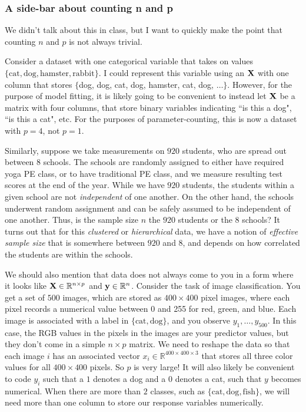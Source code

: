 \subsubsection{A side-bar about counting n and p}

We didn't talk about this in class, but I want to quickly make the point that counting $n$ and $p$ is not always trivial. 

Consider a dataset with one categorical variable that takes on values $\{ \text{cat}, \text{dog}, \text{hamster}, \text{rabbit} \}$. I could represent this variable using an $\bold{X}$  with one column that stores $\{$dog, dog, cat, dog, hamster, cat, dog, $\ldots \}$. However, for the purpose of model fitting, it is likely going to be convenient to instead let $\bold{X}$ be a matrix with four columns, that store binary variables indicating ``is this a dog", ``is this a cat", etc. For the purposes of parameter-counting, this is now a dataset with $p=4$, not $p=1$. 

Similarly, suppose we take measurements on $920$ students, who are spread out between $8$ schools. The schools are randomly assigned to either have required yoga PE class, or to have traditional PE class, and we measure resulting test scores at the end of the year. While we have $920$ students, the students within a given school are not \emph{independent} of one another. On the other hand, the schools underwent random assignment and can be safely assumed to be independent of one another. Thus, is the sample size $n$ the $920$ students or the $8$ schools? It turns out that for this \emph{clustered} or \emph{hierarchical} data, we have a notion of \emph{effective sample size} that is somewhere between $920$ and $8$, and depends on how correlated the students are within the schools. 

We should also mention that data does not always come to you in a form where it looks like $\bold{X} \in \mathbb{R}^{n \times p}$ and $\bold{y} \in \mathbb{R}^n$. Consider the task of image classification. You get a set of $500$ images, which are stored as $400 \times 400$ pixel images, where each pixel records a numerical value between 0 and 255 for red, green, and blue. Each image is associated with a label in $\{\text{cat},  \text{dog}\}$, and you observe $y_1,\ldots, y_{500}$. In this case, the RGB values in the pixels in the images are your predictor values, but they don't come in a simple $n \times p$ matrix. We need to reshape the data so that each image $i$ has an associated vector $x_i \in \mathbb{R}^{400 \times 400 \times 3}$ that stores all three color values for all $400 \times 400$ pixels. So $p$ is very large! It will also likely be convenient to code $y_i$ such that a $1$ denotes a dog and a $0$ denotes a cat, such that $y$ becomes numerical. When there are more than $2$ classes, such as $\{\text{cat},  \text{dog}, \text{fish}\}$, we will need more than one column to store our response variables numerically. 


